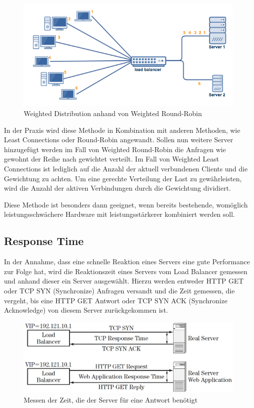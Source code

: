 \begin{figure}[!h]
	\begin{center}
		\includegraphics[width=0.8\linewidth]{images/weighted_round_robin.png}
		\caption{Weighted Distribution anhand von Weighted Round-Robin \cite{WeightedLoadBalancingGrafik}}
		\label{Weighted Round-Robin}
	\end{center}
\end{figure}

In der Praxis wird diese Methode in Kombination mit anderen Methoden, wie Least Connections oder Round-Robin angewandt.
Sollen nun weitere Server hinzugefügt werden im Fall von Weighted Round-Robin die Anfragen wie gewohnt der Reihe nach gewichtet verteilt. Im Fall von Weighted Least Connections ist lediglich auf die Anzahl der aktuell verbundenen Clients und die Gewichtung zu achten. Um eine gerechte Verteilung der Last zu gewährleisten, wird die Anzahl der aktiven Verbindungen durch die Gewichtung dividiert.

Diese Methode ist besonders dann geeignet, wenn bereits bestehende, womöglich leistungsschwächere Hardware mit leistungsstärkerer kombiniert werden soll.
\cite{LoadBalancing2}

\subsection{Response Time}
\label{sec:Response Time}
In der Annahme, dass eine schnelle Reaktion eines Servers eine gute Performance zur Folge hat, wird die Reaktionszeit eines Servers vom Load Balancer gemessen und anhand dieser ein Server ausgewählt. Hierzu werden entweder HTTP GET oder TCP SYN (Synchronize) Anfragen versandt und die Zeit gemessen, die vergeht, bis eine HTTP GET Antwort oder TCP SYN ACK (Synchronize Acknowledge) von diesem Server zurückgekommen ist. \cite{LoadBalancing2}

\begin{figure}[!h]
	\begin{center}
		\includegraphics[width=0.8\linewidth]{images/LoadBalancing_Response_Time.png}
		\caption{Messen der Zeit, die der Server für eine Antwort benötigt \cite{LoadBalancing2}}
		\label{ResponseTime}
	\end{center}
\end{figure}

